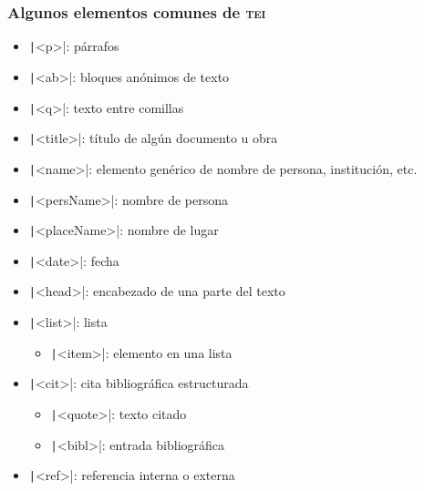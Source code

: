 \documentclass[%
  handout, %
  ]{beamer}
\newcommand*{\TEI}{\textsc{tei}}
\begin{document}
\begin{frame}
  \frametitle{Algunos elementos comunes de \TEI}
  \begin{itemize}
    \item \texttt|<p>|: párrafos
    \item \texttt|<ab>|: bloques anónimos de texto
    \item \texttt|<q>|: texto entre comillas
    \item \texttt|<title>|: título de algún documento u obra
    \item \texttt|<name>|: elemento genérico de nombre de persona, institución, etc.
    \item \texttt|<persName>|: nombre de persona
    \item \texttt|<placeName>|: nombre de lugar
    \item \texttt|<date>|: fecha
    \item \texttt|<head>|: encabezado de una parte del texto
    \item \texttt|<list>|: lista
      \begin{itemize}
        \item \texttt|<item>|: elemento en una lista
      \end{itemize}
    \item \texttt|<cit>|: cita bibliográfica estructurada
      \begin{itemize}
        \item \texttt|<quote>|: texto citado
        \item \texttt|<bibl>|: entrada bibliográfica
      \end{itemize}
    \item \texttt|<ref>|: referencia interna o externa
  \end{itemize}
\end{frame}
\end{document}
